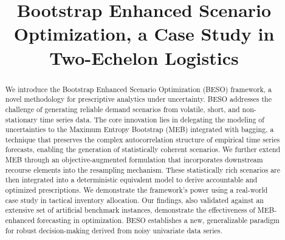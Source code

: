 \documentclass[review,a4paper,fleqn,3p,11pt,authoryear]{elsarticle}
\begin{document}
\let\WriteBookmarks\relax
\def\floatpagepagefraction{1}
\def\textpagefraction{.001}

\setlength{\abovedisplayskip}{2pt plus 2pt minus 4pt}
\setlength{\belowdisplayskip}{2pt plus 2pt minus 4pt}


\title{Bootstrap Enhanced Scenario Optimization, a Case Study in Two-Echelon Logistics}                      

%
%
%
%

\begin{abstract}
We introduce the Bootstrap Enhanced Scenario Optimization (BESO) framework, a novel methodology for prescriptive analytics under uncertainty. BESO addresses the challenge of generating reliable demand scenarios from volatile, short, and non-stationary time series data. The core innovation lies in delegating the modeling of uncertainties to the Maximum Entropy Bootstrap (MEB) integrated with bagging, a technique that preserves the complex autocorrelation structure of empirical time series forecasts, enabling the generation of statistically coherent scenarios. We further extend MEB through an objective-augmented formulation that incorporates downstream recourse elements into the resampling mechanism. These statistically rich scenarios are then integrated into a deterministic equivalent model to derive accountable and optimized prescriptions. We demonstrate the framework's power using a real-world case study in tactical inventory allocation. Our findings, also validated against an extensive set of artificial benchmark instances, demonstrate the effectiveness of MEB-enhanced forecasting in optimization. BESO establishes a new, generalizable paradigm for robust decision-making derived from noisy univariate data series.
\end{abstract}

\end{document}
